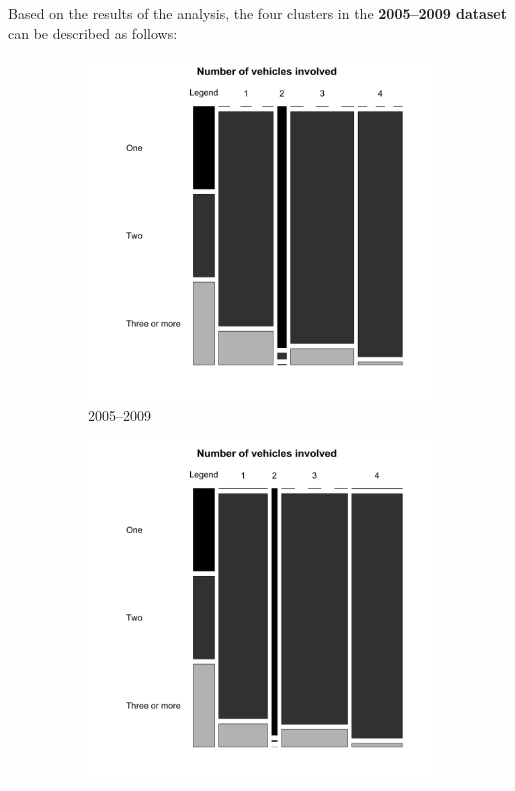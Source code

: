 Based on the results of the analysis, the four clusters in the \textbf{2005--2009 dataset} can be described as follows:

\begin{figure}[t]
        \begin{subfigure}[t]{.5\textwidth}
                \includegraphics[width=1\linewidth]{veh_invl_0509.png}
                \caption{2005--2009}
        \end{subfigure}%
        \begin{subfigure}[t]{.5\textwidth}
                \includegraphics[width=1\linewidth]{veh_invl.png}

\end{subfigure}
\end{figure}
